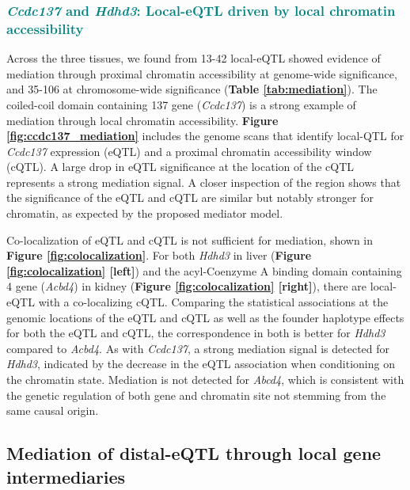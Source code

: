 \documentclass[9pt,twocolumn,twoside]{gsajnl}
\newcommand{\WVinline}[1]{\textcolor{red}{#1}}
\newcommand{\GKinline}[1]{\textcolor{teal}{#1}}
\begin{document}
\subsubsection{\GKinline{\textit{Ccdc137} and \textit{Hdhd3}: Local-eQTL driven by local chromatin accessibility}}
Across the three tissues, we found from 13-42 local-eQTL showed evidence of mediation through proximal chromatin accessibility at genome-wide significance, and 35-106 at chromosome-wide significance (\textbf{Table \ref{tab:mediation}}). The coiled-coil domain containing 137 gene (\textit{Ccdc137}) is a strong example of mediation through local chromatin accessibility. \textbf{Figure \ref{fig:ccdc137_mediation}} includes the genome scans that identify local-QTL for \textit{Ccdc137} expression (eQTL) and a proximal chromatin accessibility window (cQTL). 
A large drop in eQTL significance at the location of the cQTL represents a strong mediation signal. A closer inspection of the region shows that the significance of the eQTL and cQTL are similar but notably stronger for chromatin, as expected by the proposed mediator model. 

Co-localization of eQTL and cQTL is not sufficient for mediation, shown in \textbf{Figure \ref{fig:colocalization}}. For both \textit{Hdhd3} in liver (\textbf{Figure \ref{fig:colocalization} [left]}) and the acyl-Coenzyme A binding domain containing 4 gene (\textit{Acbd4}) in kidney (\textbf{Figure \ref{fig:colocalization} [right]}), there are local-eQTL with a co-localizing cQTL. Comparing the statistical associations at the genomic locations of the eQTL and cQTL as well as the founder haplotype effects for both the eQTL and cQTL, the correspondence in both is better for \textit{Hdhd3} compared to \textit{Acbd4}. As with \textit{Ccdc137}, a strong mediation signal is detected for \textit{Hdhd3}, indicated by the decrease in the eQTL association when conditioning on the chromatin state. Mediation is not detected for \textit{Abcd4}, which is consistent with the genetic regulation of both gene and chromatin site not stemming from the same causal origin.

\subsection{Mediation of distal-eQTL through local gene intermediaries} 
\end{document}
